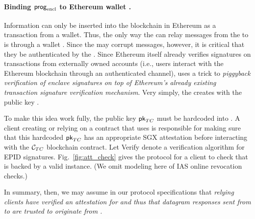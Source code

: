 \paragraph{Binding ${\sf prog}_{\textrm{encl}}$ to Ethereum wallet \tcadd.}
Information can only be inserted into the blockchain in Ethereum as a transaction from a wallet. Thus, the only way the \medname can relay messages from the \encname to \tcont is through a wallet \tcadd. Since the \medname may corrupt messages, however, it is critical that they be authenticated by the \encname. Since Ethereum itself 
already verifies signatures on transactions from externally owned accounts (i.e., users interact with the  Ethereum blockchain through an authenticated channel), \tc uses a trick to {\it piggyback verification of enclave signatures on top of Ethereum's already existing transaction signature verification mechanism}. 
Very simply, the \encname creates \tcadd with the public key \pkTC. 

To make this idea work fully, the public key ${\sf pk}_{TC}$ must be hardcoded into \tcont. A client creating or relying on a contract that uses \tcont is responsible for making sure that this hardcoded ${\sf pk}_{TC}$ has an appropriate SGX attestation before interacting with the ${\cal C}_{TC}$  blockchain contract.  Let {\sf Verify} denote a verification algorithm for EPID signatures. Fig.~\ref{fig:att_check} gives the protocol for a client to check that \tcont is backed by a valid \encname instance. (We omit modeling here of IAS online revocation checks.)


In summary, then, we may assume in our protocol specifications that {\em relying clients have verified an attestation for \encname and thus that datagram responses sent from \tcadd to \tcont are trusted to originate from \engine.} 



